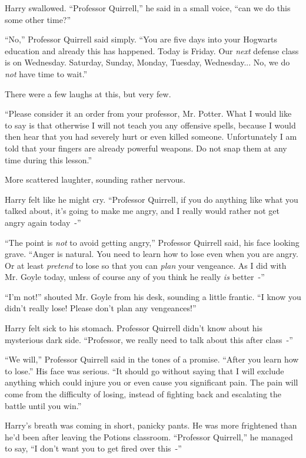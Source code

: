 Harry swallowed. ``Professor Quirrell,'' he said in a small voice, ``can we do this some other time?''

``No,'' Professor Quirrell said simply. ``You are five days into your Hogwarts education and already this has happened. Today is Friday. Our \emph{next} defense class is on Wednesday. Saturday, Sunday, Monday, Tuesday, Wednesday... No, we do \emph{not} have time to wait.''

There were a few laughs at this, but very few.

``Please consider it an order from your professor, Mr. Potter. What I would like to say is that otherwise I will not teach you any offensive spells, because I would then hear that you had severely hurt or even killed someone. Unfortunately I am told that your fingers are already powerful weapons. Do not snap them at any time during this lesson.''

More scattered laughter, sounding rather nervous.

Harry felt like he might cry. ``Professor Quirrell, if you do anything like what you talked about, it's going to make me angry, and I really would rather not get angry again today~-''

``The point is \emph{not} to avoid getting angry,'' Professor Quirrell said, his face looking grave. ``Anger is natural. You need to learn how to lose even when you are angry. Or at least \emph{pretend} to lose so that you can \emph{plan} your vengeance. As I did with Mr. Goyle today, unless of course any of you think he really \emph{is} better~-''

``I'm not!'' shouted Mr. Goyle from his desk, sounding a little frantic. ``I know you didn't really lose! Please don't plan any vengeances!''

Harry felt sick to his stomach. Professor Quirrell didn't know about his mysterious dark side. ``Professor, we really need to talk about this after class~-''

``We will,'' Professor Quirrell said in the tones of a promise. ``After you learn how to lose.'' His face was serious. ``It should go without saying that I will exclude anything which could injure you or even cause you significant pain. The pain will come from the difficulty of losing, instead of fighting back and escalating the battle until you win.''

Harry's breath was coming in short, panicky pants. He was more frightened than he'd been after leaving the Potions classroom. ``Professor Quirrell,'' he managed to say, ``I don't want you to get fired over this~-''

